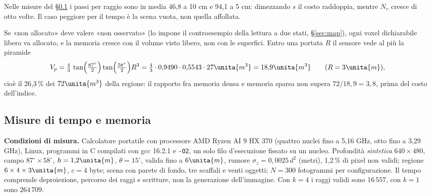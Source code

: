 Nelle misure del \S\ref{sec:cos-misure} i passi per raggio sono in media 46,8 a 10 cm e 94,1 a 5 cm: dimezzando $s$ il costo raddoppia, mentre $N_v$ cresce di otto volte. Il caso peggiore per il tempo è la scena vuota, non quella affollata.

\begin{lemma}\label{lem:cos-sparsa}
Se «non allocato» deve valere «non osservato» (lo impone il controesempio della lettura a due stati, \S\ref{sec:map}), ogni voxel dichiarabile libero va allocato, e la memoria cresce con il volume visto libero, non con le superfici. Entro una portata $R$ il sensore vede al più la piramide
\begin{equation}\label{eq:cos-piramide}
V_p=\tfrac43\,\tan\!\Big(\tfrac{87^\circ}{2}\Big)\tan\!\Big(\tfrac{58^\circ}{2}\Big)R^3=\tfrac43\cdot0{,}9490\cdot0{,}5543\cdot27\unita{m^3}=18{,}9\unita{m^3}\qquad(R=3\unita{m}),
\end{equation}
cioè il 26,3\,\% dei $72\unita{m^3}$ della regione: il rapporto fra memoria densa e memoria sparsa non supera $72/18{,}9=3{,}8$, prima del costo dell'indice. 
\end{lemma}

\subsection{Misure di tempo e memoria}\label{sec:cos-misure}

\textbf{Condizioni di misura.} Calcolatore portatile con processore AMD Ryzen AI 9 HX 370 (quattro nuclei fino a 5,16 GHz, otto fino a 3,29 GHz), Linux, programmi in C compilati con gcc 16.2.1 e \texttt{-O2}, un solo filo d'esecuzione fissato su un nucleo. Profondità \emph{sintetica} $640\times480$, campo $87^\circ\times58^\circ$, $h=1{,}2\unita{m}$, $\theta=15^\circ$, valida fino a $6\unita{m}$, rumore $\sigma_z=0{,}0025\,d^2$ (metri), 1,2\,\% di pixel non validi; regione $6\times4\times3\unita{m}$, $c=4$ byte; scena con parete di fondo, tre scaffali e venti oggetti; $N=300$ fotogrammi per configurazione. Il tempo comprende deproiezione, percorso dei raggi e scritture, non la generazione dell'immagine. Con $k=4$ i raggi validi sono $16\,557$, con $k=1$ sono $264\,709$.

